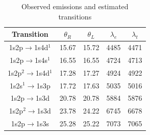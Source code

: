 \documentclass[12pt,twocolumn]{article}
\begin{document}
\begin{table}[h!]
	\label{tb:he}
	\caption{Observed emissions and estimated transitions}
	\begin{tabular}{|c|c|c|c|c|}
		\hline
		Transition & $\theta_{R}$ & $\theta_{L}$ & $\lambda_{e}$ & $\lambda_{t}$ \\ \hline
		1s2p$\rightarrow$1s4d$^{1}$ & 15.67 & 15.72 & 4485 & 4471 \\ 
		1s2p$\rightarrow$1s4s$^{1}$ & 16.55 & 16.55 & 4724 & 4713 \\ 
		1s2p$^{2}\rightarrow$1s4d$^{1}$ & 17.28 & 17.27 & 4924 & 4922 \\ 
		1s2s$^{1}\rightarrow$1s3p & 17.72 & 17.63 & 5035 & 5016 \\ 
		1s2p$\rightarrow$1s3d & 20.78 & 20.78 & 5884 & 5876 \\ 
		1s2p$^{2}\rightarrow$1s3d & 23.78 & 24.22 & 6745 & 6678 \\ 
		1s2p$\rightarrow$1s3s & 25.28 & 25.22 & 7073 & 7065 \\ 
		\hline
	\end{tabular}
\end{table}

\nocite{*}


\end{document}
